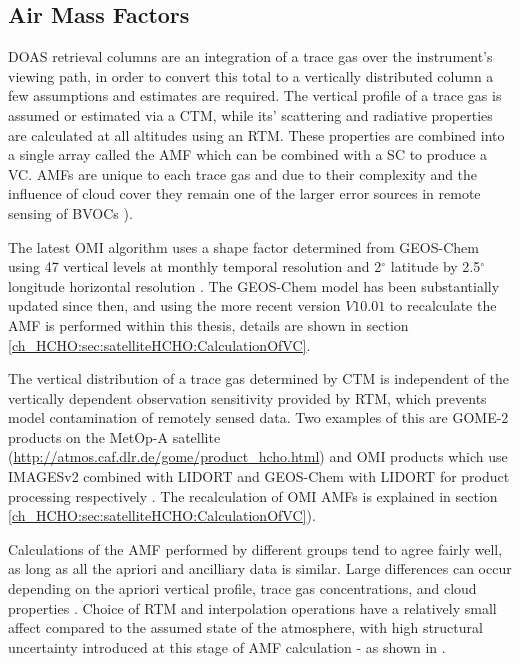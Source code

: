   
  \subsection{Air Mass Factors}
    \label{ch_HCHO:sec:satelliteHCHO:AMFs}
    DOAS retrieval columns are an integration of a trace gas over the instrument's viewing path, in order to convert this total to a vertically distributed column a few assumptions and estimates are required. 
    The vertical profile of a trace gas is assumed or estimated via a CTM, while its' scattering and radiative properties are calculated at all altitudes using an RTM. 
    These properties are combined into a single array called the AMF which can be combined with a SC to produce a VC.
    AMFs are unique to each trace gas and due to their complexity and the influence of cloud cover they remain one of the larger error sources in remote sensing of BVOCs \citep{Palmer2001,Millet2006}).
    
    The latest OMI algorithm uses a shape factor determined from GEOS-Chem using 47 vertical levels at monthly temporal resolution and 2$^{\circ}$ latitude by 2.5$^{\circ}$ longitude horizontal resolution \citep{Abad2015}.
    The GEOS-Chem model has been substantially updated since then, and using the more recent version $V10.01$ to recalculate the AMF is performed within this thesis, details are shown in section \ref{ch_HCHO:sec:satelliteHCHO:CalculationOfVC}.
    
    The vertical distribution of a trace gas determined by CTM is independent of the vertically dependent observation sensitivity provided by RTM, which prevents model contamination of remotely sensed data.
    Two examples of this are GOME-2 products on the MetOp-A satellite (\url{http://atmos.caf.dlr.de/gome/product_hcho.html}) and OMI products which use IMAGESv2 combined with LIDORT and GEOS-Chem with LIDORT for product processing respectively \citep{Chance2002, Abad2015}.
    The recalculation of OMI AMFs is explained in section \ref{ch_HCHO:sec:satelliteHCHO:CalculationOfVC}).
    
    Calculations of the AMF performed by different groups tend to agree fairly well, as long as all the apriori and ancilliary data is similar.
    Large differences can occur depending on the apriori vertical profile, trace gas concentrations, and cloud properties \citep{Lorent2017}.
    Choice of RTM and interpolation operations have a relatively small affect compared to the assumed state of the atmosphere, with high structural uncertainty introduced at this stage of AMF calculation - as shown in \cite{Lorent2017}.

